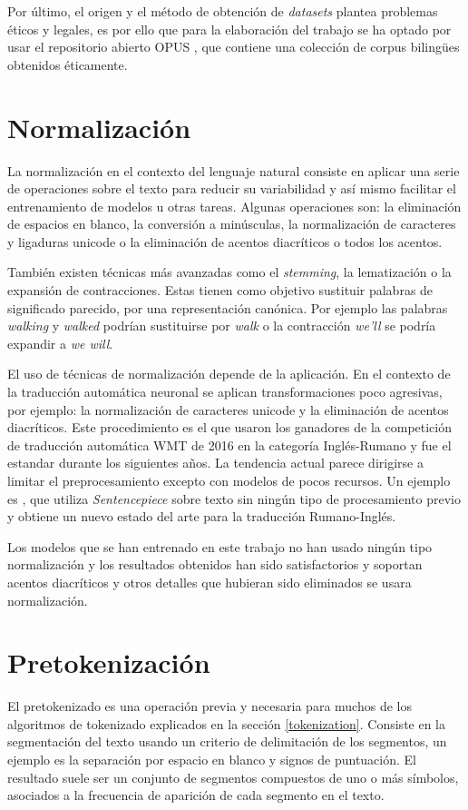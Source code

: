 Por último, el origen y el método de obtención de \textit{datasets} plantea problemas éticos y legales, es por ello que para la elaboración del trabajo se ha optado por usar el repositorio abierto OPUS \cite{CORPUS}, que contiene una colección de corpus biling{\"u}es obtenidos éticamente.

\section{Normalización}\label{datanorm}
La normalización en el contexto del lenguaje natural consiste en aplicar una serie de operaciones sobre el texto para reducir su variabilidad y así mismo facilitar el entrenamiento de modelos u otras tareas. Algunas operaciones son: la eliminación de espacios en blanco, la conversión a minúsculas, la normalización de caracteres y ligaduras unicode o la eliminación de acentos diacríticos o todos los acentos.

También existen técnicas más avanzadas como el \textit{stemming}, la lematización o la expansión de contracciones. Estas tienen como objetivo sustituir palabras de significado parecido, por una representación canónica. Por ejemplo las palabras \textit{walking} y \textit{walked} podrían sustituirse por \textit{walk} o la contracción \textit{we'll} se podría expandir a \textit{we will}.

El uso de técnicas de normalización depende de la aplicación. En el contexto de la traducción automática neuronal se aplican transformaciones poco agresivas, por ejemplo: la normalización de caracteres unicode y la eliminación de acentos diacríticos.
Este procedimiento es el que usaron los ganadores de la competición de traducción automática WMT de 2016 en la categoría Inglés-Rumano \cite{Sennrich2016Jun} y fue el estandar durante los siguientes años. La tendencia actual parece dirigirse a limitar el preprocesamiento excepto con modelos de pocos recursos. Un ejemplo es \cite{Liu2020Jan}, que utiliza \textit{Sentencepiece} sobre texto sin ningún tipo de procesamiento previo y obtiene un nuevo estado del arte para la traducción Rumano-Inglés.

Los modelos que se han entrenado en este trabajo no han usado ningún tipo normalización y los resultados obtenidos han sido satisfactorios y soportan acentos diacríticos y otros detalles que hubieran sido eliminados se usara normalización.

\section{Pretokenización}
El pretokenizado es una operación previa y necesaria para muchos de los algoritmos de tokenizado explicados en la sección \ref{tokenization}. Consiste en la segmentación del texto usando un criterio de delimitación de los segmentos, un ejemplo es la separación por espacio en blanco y signos de puntuación.
El resultado suele ser un conjunto de segmentos compuestos de uno o más símbolos, asociados a la frecuencia de aparición de cada segmento en el texto. 

